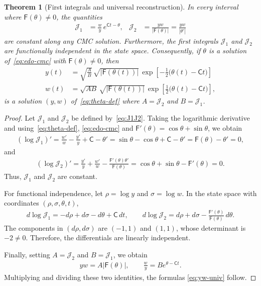 \documentclass[10pt,a4paper]{amsart}
\newtheorem{theorem}{Theorem}
\newcommand{\C}{\mathsf{C}}
\newcommand{\F}{\mathsf{F}}
\newcommand{\J}{\mathcal{J}}
\begin{document}
\begin{theorem}[First integrals and universal reconstruction]
\label{thm:integrais-reconstrucao}
In every interval where $\F(\theta)\neq0$, the quantities
\begin{align}\label{eq:J1J2}
\J_1&=\frac{w}{y}\,e^{\C t-\theta},&
\J_2&=\frac{yw}{|\F(\theta)|}=\frac{yw}{|\theta'|}
\end{align}
are constant along any CMC solution. Furthermore, the first integrals $\J_1$ and $\J_2$ are functionally independent in the state space.
Consequently, if $\theta$ is a solution 
of~\eqref{eq:edo-cmc} with $\F(\theta)\neq0$, then
\begin{equation}\label{eq:yw-univ}
\boxed{\;
\begin{aligned}
y(t)&=\sqrt{\frac AB}\,\sqrt{|\F(\theta(t))|}\,
\exp\!\left[-\frac12\bigl(\theta(t)-\C t\bigr)\right]\\[2pt]
w(t)&=\sqrt{AB}\,\sqrt{|\F(\theta(t))|}\,
\exp\!\left[\frac12\bigl(\theta(t)-\C t\bigr)\right],
\end{aligned}
\;}
\end{equation}
is a solution $(y,w)$ of~\eqref{eq:theta-def} where
$A=\J_2$ and $B=\J_1$.
\end{theorem}

\begin{proof}
Let $\J_1$ and $\J_2$ be defined by~\eqref{eq:J1J2}.
Taking the logarithmic derivative and using~\eqref{eq:theta-def},
\eqref{eq:edo-cmc} and $\F'(\theta)=\cos\theta+\sin\theta$, we obtain
\begin{align*}
(\log\J_1)'
=
\frac{w'}w-\frac{y'}y+\C-\theta'
=
\sin\theta-\cos\theta+\C-\theta'
=
\F(\theta)-\theta'
=
0,
\end{align*}
and
\begin{align*}
(\log\J_2)'
=
\frac{y'}y+\frac{w'}w-\frac{\F'(\theta)\theta'}{\F(\theta)}
=
\cos\theta+\sin\theta-\F'(\theta)
=
0.
\end{align*}
Thus, $\J_1$ and $\J_2$ are constant.

For functional independence, let $\rho=\log y$ and $\sigma=\log w$.
In the state space with coordinates $(\rho,\sigma,\theta,t)$,
\begin{align*}
d\log\J_1
=
-d\rho+d\sigma-d\theta+\C\,dt,
\qquad
d\log\J_2
=
d\rho+d\sigma-\frac{\F'(\theta)}{\F(\theta)}\,d\theta.
\end{align*}
The components in $(d\rho,d\sigma)$ are $(-1,1)$ and $(1,1)$, whose
determinant is $-2\neq0$. Therefore, the differentials are linearly
independent.

Finally, setting $A=\J_2$ and $B=\J_1$, we obtain
\begin{align*}
yw=A|\F(\theta)|,
\qquad
\frac wy=B e^{\theta-\C t}.
\end{align*}
Multiplying and dividing these two identities, the formulas
\eqref{eq:yw-univ} follow.
\end{proof}
\end{document}

